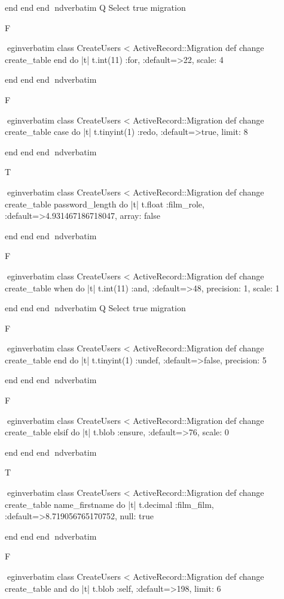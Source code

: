     end 
  end 
end
nd{verbatim}
Q
 Select true migration

F

egin{verbatim}
 class CreateUsers < ActiveRecord::Migration 
  def change 
    create_table end do |t| 
      t.int(11) :for, :default=>22, scale: 4
    
    end 
  end 
end
nd{verbatim}

F

egin{verbatim}
 class CreateUsers < ActiveRecord::Migration 
  def change 
    create_table case do |t| 
      t.tinyint(1) :redo, :default=>true, limit: 8
    
    end 
  end 
end
nd{verbatim}

T

egin{verbatim}
 class CreateUsers < ActiveRecord::Migration 
  def change 
    create_table password_length do |t| 
      t.float :film_role, :default=>4.931467186718047, array: false
    
    end 
  end 
end
nd{verbatim}

F

egin{verbatim}
 class CreateUsers < ActiveRecord::Migration 
  def change 
    create_table when do |t| 
      t.int(11) :and, :default=>48, precision: 1, scale: 1
    
    end 
  end 
end
nd{verbatim}
Q
 Select true migration

F

egin{verbatim}
 class CreateUsers < ActiveRecord::Migration 
  def change 
    create_table end do |t| 
      t.tinyint(1) :undef, :default=>false, precision: 5
    
    end 
  end 
end
nd{verbatim}

F

egin{verbatim}
 class CreateUsers < ActiveRecord::Migration 
  def change 
    create_table elsif do |t| 
      t.blob :ensure, :default=>76, scale: 0
    
    end 
  end 
end
nd{verbatim}

T

egin{verbatim}
 class CreateUsers < ActiveRecord::Migration 
  def change 
    create_table name_firstname do |t| 
      t.decimal :film_film, :default=>8.719056765170752, null: true
    
    end 
  end 
end
nd{verbatim}

F

egin{verbatim}
 class CreateUsers < ActiveRecord::Migration 
  def change 
    create_table and do |t| 
      t.blob :self, :default=>198, limit: 6
    
